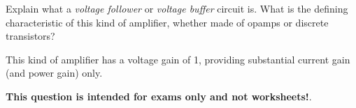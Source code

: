 

Explain what a {\it voltage follower} or {\it voltage buffer} circuit is.  What is the defining characteristic of this kind of amplifier, whether made of opamps or discrete transistors?







This kind of amplifier has a voltage gain of 1, providing substantial current gain (and power gain) only.







{\bf This question is intended for exams only and not worksheets!}.



